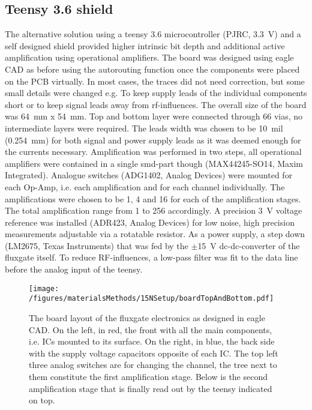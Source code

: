         \subsection{Teensy 3.6 shield}
            The alternative solution using a teensy 3.6 microcontroller (PJRC, \SI{3.3}{\volt}) and a self designed shield provided higher intrinsic bit depth and additional active amplification using operational amplifiers.  The board was designed using eagle CAD as before using the autorouting function once the components were placed on the PCB virtually.  In most cases, the traces did not need correction, but some small details were changed e.g.  To keep supply leads of the individual components short or to keep signal leads away from rf-influences.  The overall size of the board was \SI{64}{\mm} x \SI{54}{\mm}.  Top and bottom layer were connected through 66 vias, no intermediate layers were required.  The leads width was chosen to be \SI{10}{mil} (\SI{0.254}{\mm}) for both signal and power supply leads as it was deemed enough for the currents necessary. 
            Amplification was performed in two steps, all operational amplifiers were contained in a single smd-part though (MAX44245-SO14, Maxim Integrated). Analogue switches (ADG1402, Analog Devices) were mounted for each Op-Amp, i.e. each amplification and for each channel individually. The amplifications were chosen to be 1, 4 and 16 for each of the amplification stages. The total amplification range from 1 to 256 accordingly. A precision \SI{3}{\volt} voltage reference was installed (ADR423, Analog Devices) for low noise, high precision measurements adjustable via a rotatable resistor. As a power supply, a step down (LM2675, Texas Instruments) that was fed by the $\pm$\SI{15}{\volt} dc-dc-converter of the fluxgate itself. To reduce RF-influences, a low-pass filter was fit to the data line before the analog input of the teensy. 
            \begin{figure}
                \texttt{[image: /figures/materialsMethods/15NSetup/boardTopAndBottom.pdf]}
                \caption[Fluxgate board layout]{The board layout of the fluxgate electronics as designed in eagle CAD. On the left, in red, the front with all the main components, i.e. ICs mounted to its surface. On the right, in blue, the back side with the supply voltage capacitors opposite of each IC. The top left three analog switches are for changing the channel, the tree next to them constitute the first amplification stage. Below is the second amplification stage that is finally read out by the teensy indicated on top.}
                \label{fig:materialsMethods:fluxgateBoard}
            \end{figure}
